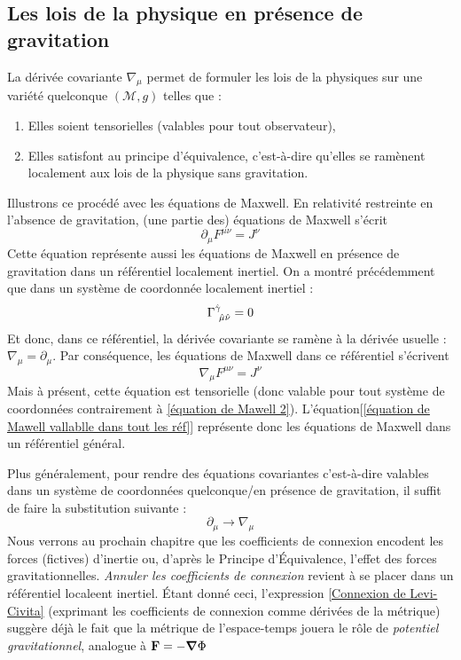 \subsection{Les lois de la physique en présence de gravitation}
La dérivée covariante $\nabla_{\mu}$ permet de formuler les lois de la physiques sur une variété quelconque $(\mathcal{M}, g)$ telles que :
\begin{enumerate}
    \item Elles soient tensorielles (valables pour tout observateur),
    \item Elles satisfont au principe d'équivalence, c'est-à-dire qu'elles se ramènent localement aux lois de la physique sans gravitation.
\end{enumerate}
Illustrons ce procédé avec les équations de Maxwell. En relativité restreinte en l'absence de gravitation, (une partie des) équations de Maxwell s'écrit
\begin{equation}
    \partial_{\mu}F^{\mu \nu} = J^{\nu}
\label{équation de Mawell 2}
\end{equation}
Cette équation représente aussi les équations de Maxwell en présence de gravitation dans un référentiel localement inertiel. On a montré précédemment que dans un système de coordonnée localement inertiel :
\begin{equation}
    \Gamma\indices{^{\hat{\gamma}}_{\!\hat{\mu} \hat{\nu}}} = 0
\end{equation}
 Et donc, dans ce référentiel, la dérivée covariante se ramène à la dérivée usuelle : $\nabla_{\mu} = \partial_{\mu}$. Par conséquence, les équations de Maxwell dans ce référentiel s'écrivent
 \begin{equation}
     \nabla_{\mu} F^{\mu \nu} = J^{\nu}
     \label{équation de Mawell vallablle dans tout les réf}
 \end{equation}
 Mais à présent, cette équation est tensorielle (donc valable pour tout système de coordonnées contrairement à \ref{équation de Mawell 2}). L'équation[\ref{équation de Mawell vallablle dans tout les réf}] représente donc les équations de Maxwell dans un référentiel général. 

 Plus généralement, pour rendre des équations covariantes c'est-à-dire valables dans un système de coordonnées quelconque/en présence de gravitation, il suffit de faire la substitution suivante :
 \begin{equation}
     \partial_{\mu} \rightarrow \nabla_{\mu}
 \end{equation}
Nous verrons au prochain chapitre que les coefficients de connexion encodent les forces (fictives) d'inertie ou, d'après le Principe d'Équivalence, l'effet des forces gravitationnelles. \emph{Annuler les coefficients de connexion} revient à se placer dans un référentiel localeent inertiel. Étant donné ceci, l'expression \ref{Connexion de Levi-Civita} (exprimant les coefficients de connexion comme dérivées de la métrique) suggère déjà le fait que la métrique de l'espace-temps jouera le rôle de \emph{potentiel gravitationnel}, analogue à $\bm{\mathrm{F}} = - \bm{\mathrm{\nabla}} \Phi$
